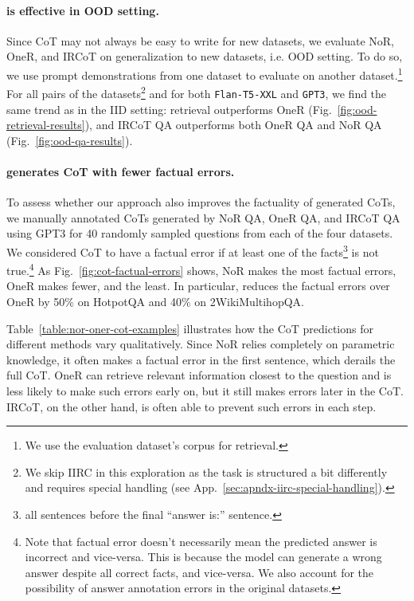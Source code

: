 \paragraph{\iconsys is effective in OOD setting. }

Since CoT may not always be easy to write for new datasets, we evaluate NoR, OneR, and IRCoT on generalization to new datasets, i.e. OOD setting. To do so, we use prompt demonstrations from one dataset to evaluate on another dataset.\footnote{We use the evaluation dataset's corpus for retrieval.} For all pairs of the datasets\footnote{We skip IIRC in this exploration as the task is structured a bit differently and requires special handling (see App.~\ref{sec:apndx-iirc-special-handling}).} and for both \texttt{Flan-T5-XXL} and \texttt{GPT3}, we find the same trend as in the IID setting: \iconsys retrieval outperforms OneR (Fig.~\ref{fig:ood-retrieval-results}), and IRCoT QA outperforms both OneR QA and NoR QA (Fig.~\ref{fig:ood-qa-results}).


\paragraph{\iconsys generates CoT with fewer factual errors.}

To assess whether our approach also improves the factuality of generated CoTs, we manually annotated CoTs generated by NoR QA, OneR QA, and IRCoT QA using GPT3 for 40 randomly sampled questions from each of the four datasets. We considered CoT to have a factual error if at least one of the facts\footnote{all sentences before the final ``answer is:'' sentence.} is not true.\footnote{Note that factual error doesn't necessarily mean the predicted answer is incorrect and vice-versa. This is because the model can generate a wrong answer despite all correct facts, and vice-versa. We also account for the possibility of answer annotation errors in the original datasets.} As Fig.~\ref{fig:cot-factual-errors} shows, NoR makes the most factual errors, OneR makes fewer, and \iconsys the least. In particular, \iconsys reduces the factual errors over OneR by 50\% on HotpotQA and 40\% on 2WikiMultihopQA.


Table~\ref{table:nor-oner-cot-examples} illustrates how the CoT predictions for different methods vary qualitatively. Since NoR relies completely on parametric knowledge, it often makes a factual error in the first sentence, which derails the full CoT. OneR can retrieve relevant information closest to the question and is less likely to make such errors early on, but it still makes errors later in the CoT. IRCoT, on the other hand, is often able to prevent such errors in each step.

